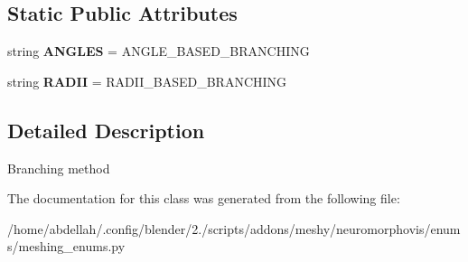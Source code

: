\subsection*{Static Public Attributes}
\begin{DoxyCompactItemize}
\item 
string {\bfseries A\+N\+G\+L\+ES} = \textquotesingle{}A\+N\+G\+L\+E\+\_\+\+B\+A\+S\+E\+D\+\_\+\+B\+R\+A\+N\+C\+H\+I\+NG\textquotesingle{}\hypertarget{classmeshy_1_1neuromorphovis_1_1enums_1_1meshing__enums_1_1Meshing_1_1Branching_a3ef5206ff2db49106d0136272fc524d9}{}\label{classmeshy_1_1neuromorphovis_1_1enums_1_1meshing__enums_1_1Meshing_1_1Branching_a3ef5206ff2db49106d0136272fc524d9}

\item 
string {\bfseries R\+A\+D\+II} = \textquotesingle{}R\+A\+D\+I\+I\+\_\+\+B\+A\+S\+E\+D\+\_\+\+B\+R\+A\+N\+C\+H\+I\+NG\textquotesingle{}\hypertarget{classmeshy_1_1neuromorphovis_1_1enums_1_1meshing__enums_1_1Meshing_1_1Branching_aef073b1b55f697f9407dc43b0c1f6328}{}\label{classmeshy_1_1neuromorphovis_1_1enums_1_1meshing__enums_1_1Meshing_1_1Branching_aef073b1b55f697f9407dc43b0c1f6328}

\end{DoxyCompactItemize}


\subsection{Detailed Description}


\begin{DoxyVerb}Branching method
\end{DoxyVerb}
 

The documentation for this class was generated from the following file\+:\begin{DoxyCompactItemize}
\item 
/home/abdellah/.\+config/blender/2./scripts/addons/meshy/neuromorphovis/enums/meshing\+\_\+enums.\+py\end{DoxyCompactItemize}
